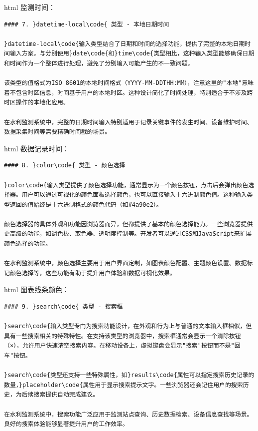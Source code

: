 html 监测时间：

\begin{lstlisting}
#### 7. }datetime-local\code{ 类型 - 本地日期时间

}datetime-local\code{输入类型结合了日期和时间的选择功能，提供了完整的本地日期时间输入方案。与分别使用}date\code{和}time\code{类型相比，这种输入类型能够确保日期和时间作为一个整体进行处理，避免了分别输入可能产生的不一致问题。

该类型的值格式为ISO 8601的本地时间格式（YYYY-MM-DDTHH:MM），注意这里的"本地"意味着不包含时区信息，时间基于用户的本地时区。这种设计简化了时间处理，特别适合于不涉及跨时区操作的本地化应用。

在水利监测系统中，完整的日期时间输入特别适用于记录关键事件的发生时间、设备维护时间、数据采集时间等需要精确时间戳的场景。

\end{lstlisting}

html 数据记录时间：

\begin{lstlisting}
#### 8. }color\code{ 类型 - 颜色选择

}color\code{输入类型提供了颜色选择功能，通常显示为一个颜色按钮，点击后会弹出颜色选择器。用户可以通过可视化的颜色面板选择颜色，也可以直接输入十六进制颜色值。这种输入类型返回的值始终是十六进制格式的颜色代码（如#4a90e2）。

颜色选择器的具体外观和功能因浏览器而异，但都提供了基本的颜色选择能力。一些浏览器提供更高级的功能，如调色板、取色器、透明度控制等。开发者可以通过CSS和JavaScript来扩展颜色选择的功能。

在水利监测系统中，颜色选择主要用于用户界面定制，如图表颜色配置、主题颜色设置、数据标记颜色选择等，这些功能有助于提升用户体验和数据可视化效果。

\end{lstlisting}

html 图表线条颜色：

\begin{lstlisting}
#### 9. }search\code{ 类型 - 搜索框

}search\code{输入类型专门为搜索功能设计，在外观和行为上与普通的文本输入框相似，但具有一些搜索相关的特殊特性。在支持该类型的浏览器中，搜索框通常会显示一个清除按钮（×），允许用户快速清空搜索内容。在移动设备上，虚拟键盘会显示"搜索"按钮而不是"回车"按钮。

}search\code{类型还支持一些特殊属性，如}results\code{属性可以指定搜索历史记录的数量，}placeholder\code{属性用于显示搜索提示文字。一些浏览器还会记住用户的搜索历史，为后续搜索提供自动完成建议。

在水利监测系统中，搜索功能广泛应用于监测站点查询、历史数据检索、设备信息查找等场景。良好的搜索体验能够显著提升用户的工作效率。

\end{lstlisting}

